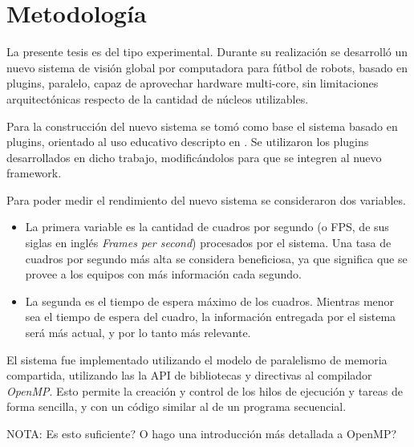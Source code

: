 
\section{Metodología}

La presente tesis es del tipo experimental. Durante su realización se desarrolló
un nuevo sistema de visión global por computadora para fútbol de robots, basado
en plugins, paralelo, capaz de aprovechar hardware multi-core, sin limitaciones
arquitectónicas respecto de la cantidad de núcleos utilizables.

Para la construcción del nuevo sistema se tomó como base el sistema basado en
plugins, orientado al uso educativo descripto en \cite{torres2014}. Se
utilizaron los plugins desarrollados en dicho trabajo, modificándolos para que
se integren al nuevo framework.

Para poder medir el rendimiento del nuevo sistema se consideraron dos variables.

\begin {itemize}

	\item	La primera variable es la cantidad de cuadros por segundo (o
		FPS, de sus siglas en inglés \emph{Frames per second})
		procesados por el sistema. Una tasa de cuadros por segundo más
		alta se considera beneficiosa, ya que significa que se provee a
		los equipos con más información cada segundo.

	\item	La segunda es el tiempo de espera máximo de los cuadros.
		Mientras menor sea el tiempo de espera del cuadro, la
		información entregada por el sistema será más actual, y por lo
		tanto más relevante.

\end {itemize}

El sistema fue implementado utilizando el modelo de paralelismo de memoria
compartida, utilizando las la API de bibliotecas y directivas al compilador
\emph{OpenMP}. Esto permite la creación y control de los hilos de ejecución
y tareas de forma sencilla, y con un código similar al de un programa
secuencial.

NOTA: Es esto suficiente? O hago una introducción más detallada a OpenMP?
